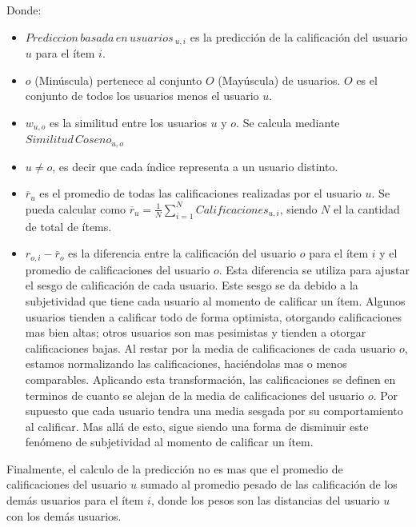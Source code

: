 \documentclass[11pt,a4paper,twoside]{thesis}
\begin{document}
\begin{description}
	\item[Donde:]
\end{description}
\begin{itemize}
	\item $Prediccion \mspace{3mu}basada \mspace{3mu}en \mspace{3mu}usuarios\mspace{3mu}_{u, i}$ es la predicción de la calificación del usuario $u$ para el ítem $i$.
	\item $o$ (Minúscula) pertenece al conjunto $O$ (Mayúscula) de usuarios. $O$ es el conjunto de todos los usuarios menos el usuario $u$.
	\item $w_{u,o}$ es la similitud entre los usuarios $u$ y $o$. Se calcula mediante $Similitud \mspace{3mu}Coseno_{u, o}$
	\item $u \neq o$, es decir que cada índice representa a un usuario distinto.
	\item $\overline{r}_{u}$ es el promedio de todas las calificaciones realizadas por el usuario $u$. Se pueda calcular como $\overline{r}_{u} = \frac{1}{N} \sum_{i=1}^N Calificaciones_{u,i}$, siendo $N$ el la cantidad de total de ítems.
	\item $r_{o,i} - \overline{r}_{o}$ es la diferencia entre la calificación del usuario $o$ para
	      el ítem $i$ y el promedio de calificaciones del usuario $o$. Esta diferencia se utiliza
	      para ajustar el sesgo de calificación de cada usuario. Este sesgo se da debido a la
	      subjetividad que tiene cada usuario al momento de calificar un ítem. Algunos usuarios
	      tienden a calificar todo de forma optimista, otorgando calificaciones mas bien altas;
	      otros usuarios son mas pesimistas y tienden a otorgar  calificaciones bajas. Al restar
	      por la media de calificaciones de cada usuario $o$, estamos normalizando
	      las calificaciones, haciéndolas mas o menos comparables. Aplicando esta transformación,
	      las calificaciones se definen en terminos de cuanto se alejan de la media de
	      calificaciones del usuario $o$.
	      Por supuesto que cada usuario tendra una media sesgada por su comportamiento al calificar. Mas allá
	      de esto, sigue siendo una forma de disminuir este fenómeno de subjetividad al
	      momento de calificar un ítem.
\end{itemize}

Finalmente, el calculo de la predicción no es mas que el promedio de
calificaciones del usuario $u$ sumado al promedio pesado de las calificación de
los demás usuarios para el ítem $i$, donde los pesos son las distancias del
usuario $u$ con los demás usuarios.
\end{document}
